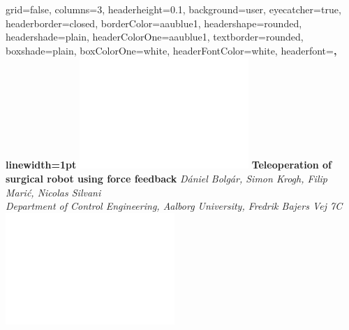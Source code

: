 \documentclass[a0paper,landscape]{baposter}
\begin{document}
\begin{poster}{
  grid=false,
  columns=3,
  headerheight=0.1\textheight,
  background=user,
  eyecatcher=true,
  headerborder=closed,
  borderColor=aaublue1,
  headershape=rounded,%
  headershade=plain,
  headerColorOne=aaublue1,
  textborder=rounded,%
  boxshade=plain,
  boxColorOne=white,
  headerFontColor=white,
  headerfont=\Large\sf\bf,
  linewidth=1pt
}
{
  \includegraphics[height=0.75\headerheight]{aau_logo_new_neg}
}
{\color{white}\bf
  Teleoperation of surgical robot using force feedback
}
{\vspace{0.3em}\color{white}\small
  \textit{\vspace{0.1em}Dániel Bolgár, Simon Krogh, Filip Marić, Nicolas Silvani\\
  Department of Control Engineering, Aalborg University, Fredrik Bajers Vej 7C}
}
{
  \includegraphics[height=0.75\headerheight]{aau_logo_new_neg}
}



\end{poster}
\end{document}
